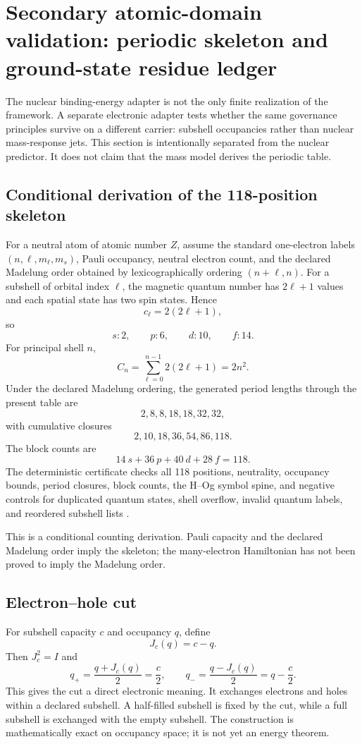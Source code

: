 \section{Secondary atomic-domain validation: periodic skeleton and ground-state residue ledger}

The nuclear binding-energy adapter is not the only finite realization of the framework. A separate electronic adapter tests whether the same governance principles survive on a different carrier: subshell occupancies rather than nuclear mass-response jets. This section is intentionally separated from the nuclear predictor. It does not claim that the mass model derives the periodic table.

\subsection{Conditional derivation of the 118-position skeleton}

For a neutral atom of atomic number $Z$, assume the standard one-electron labels $(n,\ell,m_\ell,m_s)$, Pauli occupancy, neutral electron count, and the declared Madelung order obtained by lexicographically ordering $(n+\ell,n)$. For a subshell of orbital index $\ell$, the magnetic quantum number has $2\ell+1$ values and each spatial state has two spin states. Hence
\[
 c_\ell=2(2\ell+1),
\]
so
\[
 s:2,\qquad p:6,\qquad d:10,\qquad f:14.
\]
For principal shell $n$,
\[
 C_n=\sum_{\ell=0}^{n-1}2(2\ell+1)=2n^2.
\]
Under the declared Madelung ordering, the generated period lengths through the present table are
\[
 \boxed{2,8,8,18,18,32,32},
\]
with cumulative closures
\[
 \boxed{2,10,18,36,54,86,118}.
\]
The block counts are
\[
 \boxed{14\ s+36\ p+40\ d+28\ f=118}.
\]
The deterministic certificate checks all 118 positions, neutrality, occupancy bounds, period closures, block counts, the H--Og symbol spine, and negative controls for duplicated quantum states, shell overflow, invalid quantum labels, and reordered subshell lists \cite{atomicRelease}.

This is a conditional counting derivation. Pauli capacity and the declared Madelung order imply the skeleton; the many-electron Hamiltonian has not been proved to imply the Madelung order.

\subsection{Electron--hole cut}

For subshell capacity $c$ and occupancy $q$, define
\[
 J_c(q)=c-q.
\]
Then $J_c^2=I$ and
\[
 q_+=\frac{q+J_c(q)}2=\frac c2,
 \qquad
 q_-=\frac{q-J_c(q)}2=q-\frac c2.
\]
This gives the cut a direct electronic meaning. It exchanges electrons and holes within a declared subshell. A half-filled subshell is fixed by the cut, while a full subshell is exchanged with the empty subshell. The construction is mathematically exact on occupancy space; it is not yet an energy theorem.

